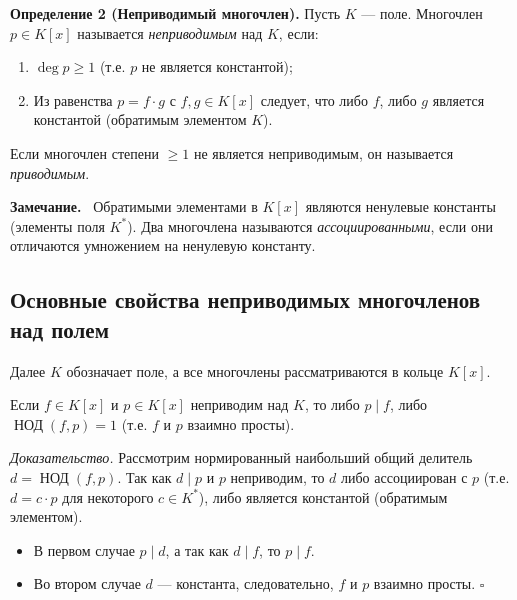 \documentclass[a4paper,12pt]{article}
\newcommand{\myremark}{\textbf{Замечание.}\ }
\theoremstyle{definition}
\theoremstyle{plain}
\theoremstyle{remark}
\begin{document}
	\medskip
	
	\noindent \textbf{Определение 2 (Неприводимый многочлен).}
	Пусть \( K \) — поле. Многочлен \( p \in K[x] \) называется \textit{неприводимым} над \( K \), если:
	\begin{enumerate}
		\item \( \deg p \geq 1 \) (т.е. \( p \) не является константой);
		\item Из равенства \( p = f \cdot g \) с \( f, g \in K[x] \) следует, что либо \( f \), либо \( g \) является константой (обратимым элементом \( K \)).
	\end{enumerate}
	
	Если многочлен степени \( \geq 1 \) не является неприводимым, он называется \textit{приводимым}.
	
	\myremark
	Обратимыми элементами в \( K[x] \) являются ненулевые константы (элементы поля \( K^* \)). Два многочлена называются \textit{ассоциированными}, если они отличаются умножением на ненулевую константу.
	
	\subsection{Основные свойства неприводимых многочленов над полем}
	
	Далее \( K \) обозначает поле, а все многочлены рассматриваются в кольце \( K[x] \).
	
	\begin{tcolorbox}[colback=blue!5, colframe=blue!40!black, title=Свойство 1 (Взаимная простота с неприводимым)]
		Если \( f \in K[x] \) и \( p \in K[x] \) неприводим над \( K \), то либо \( p \mid f \), либо \( \operatorname{НОД}(f, p) = 1 \) (т.е. \( f \) и \( p \) взаимно просты).
	\end{tcolorbox}
	
	\medskip
	\textit{Доказательство.}
	Рассмотрим нормированный наибольший общий делитель \( d = \operatorname{НОД}(f, p) \). Так как \( d \mid p \) и \( p \) неприводим, то \( d \) либо ассоциирован с \( p \) (т.е. \( d = c \cdot p \) для некоторого \( c \in K^* \)), либо является константой (обратимым элементом).
	
	\begin{itemize}
		\item В первом случае \( p \mid d \), а так как \( d \mid f \), то \( p \mid f \).
		\item Во втором случае \( d \) — константа, следовательно, \( f \) и \( p \) взаимно просты. \hfill \(\square\)
	\end{itemize}
	
\end{document}
